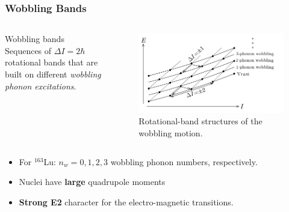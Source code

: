 \documentclass{beamer}
\begin{document}
\begin{frame}
  \frametitle{Wobbling Bands}
  
  \begin{columns} 
  \begin{block}{Wobbling bands}
    Sequences of $\Delta I=2\hbar$ rotational bands that are built on different \textit{wobbling phonon excitations}.
  \end{block}
  
  \begin{figure}
      \centering
      \includegraphics[scale=0.14]{figures/wobblingBands.png}
      \caption{Rotational-band structures of the wobbling motion.}
    \end{figure}
  \end{columns}
    \begin{itemize}
      \item For $^{163}$Lu: $n_w=0,1,2,3$ wobbling phonon numbers, respectively.
      \item Nuclei have \textbf{large} quadrupole moments
      \item \textbf{Strong E2} character for the electro-magnetic transitions.
    \end{itemize}

\end{frame}
\end{document}
